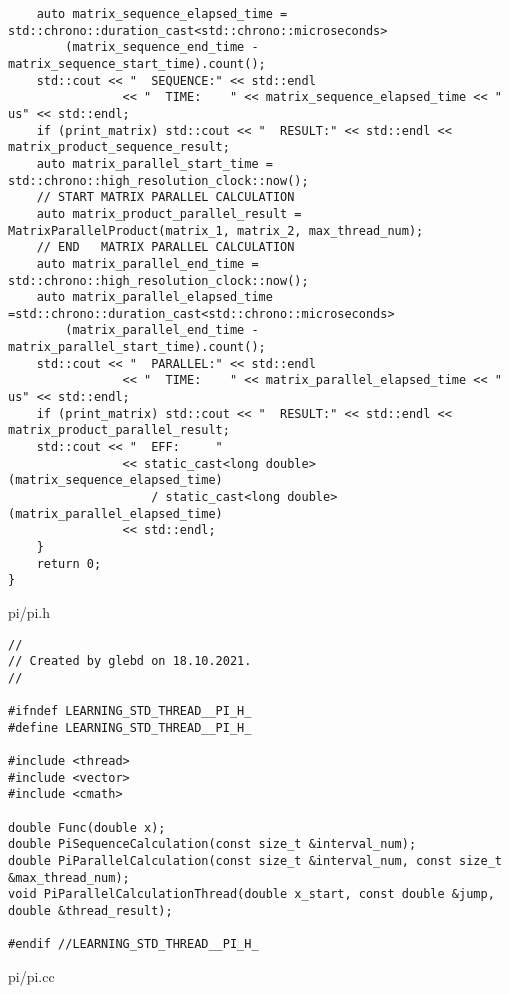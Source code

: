 \documentclass{report}
\begin{document}
\begin{lstlisting}
	auto matrix_sequence_elapsed_time = std::chrono::duration_cast<std::chrono::microseconds>
		(matrix_sequence_end_time - matrix_sequence_start_time).count();
	std::cout << "  SEQUENCE:" << std::endl
				<< "  TIME:    " << matrix_sequence_elapsed_time << " us" << std::endl;
	if (print_matrix) std::cout << "  RESULT:" << std::endl << matrix_product_sequence_result;
	auto matrix_parallel_start_time = std::chrono::high_resolution_clock::now();
	// START MATRIX PARALLEL CALCULATION
	auto matrix_product_parallel_result = MatrixParallelProduct(matrix_1, matrix_2, max_thread_num);
	// END   MATRIX PARALLEL CALCULATION
	auto matrix_parallel_end_time = std::chrono::high_resolution_clock::now();
	auto matrix_parallel_elapsed_time =std::chrono::duration_cast<std::chrono::microseconds>
		(matrix_parallel_end_time - matrix_parallel_start_time).count();
	std::cout << "  PARALLEL:" << std::endl
				<< "  TIME:    " << matrix_parallel_elapsed_time << " us" << std::endl;
	if (print_matrix) std::cout << "  RESULT:" << std::endl << matrix_product_parallel_result;
	std::cout << "  EFF:     "
				<< static_cast<long double>(matrix_sequence_elapsed_time)
					/ static_cast<long double>(matrix_parallel_elapsed_time)
				<< std::endl;
	}
	return 0;
}	
\end{lstlisting}
pi/pi.h
\begin{lstlisting}
//
// Created by glebd on 18.10.2021.
//

#ifndef LEARNING_STD_THREAD__PI_H_
#define LEARNING_STD_THREAD__PI_H_

#include <thread>
#include <vector>
#include <cmath>

double Func(double x);
double PiSequenceCalculation(const size_t &interval_num);
double PiParallelCalculation(const size_t &interval_num, const size_t &max_thread_num);
void PiParallelCalculationThread(double x_start, const double &jump, double &thread_result);

#endif //LEARNING_STD_THREAD__PI_H_  
\end{lstlisting}
pi/pi.cc
\end{document}
